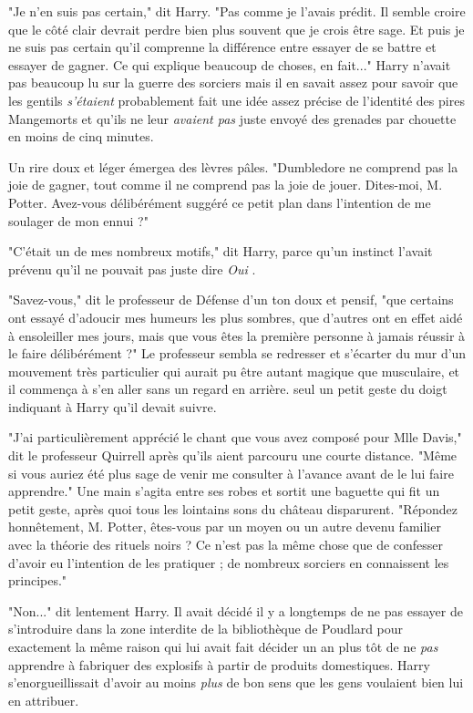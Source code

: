 "Je n'en suis pas certain," dit Harry. "Pas comme je l'avais prédit. Il semble croire que le côté clair devrait perdre bien plus souvent que je crois être sage. Et puis je ne suis pas certain qu'il comprenne la différence entre essayer de se battre et essayer de gagner. Ce qui explique beaucoup de choses, en fait..." Harry n'avait pas beaucoup lu sur la guerre des sorciers mais il en savait assez pour savoir que les gentils \emph{s'étaient } probablement fait une idée assez précise de l'identité des pires Mangemorts et qu'ils ne leur \emph{avaient pas}  juste envoyé des grenades par chouette en moins de cinq minutes.

Un rire doux et léger émergea des lèvres pâles. "Dumbledore ne comprend pas la joie de gagner, tout comme il ne comprend pas la joie de jouer. Dites-moi, M. Potter. Avez-vous délibérément suggéré ce petit plan dans l'intention de me soulager de mon ennui ?"

"C'était un de mes nombreux motifs," dit Harry, parce qu'un instinct l'avait prévenu qu'il ne pouvait pas juste dire \emph{Oui} .

"Savez-vous," dit le professeur de Défense d'un ton doux et pensif, "que certains ont essayé d'adoucir mes humeurs les plus sombres, que d'autres ont en effet aidé à ensoleiller mes jours, mais que vous êtes la première personne à jamais réussir à le faire délibérément ?" Le professeur sembla se redresser et s'écarter du mur d'un mouvement très particulier qui aurait pu être autant magique que musculaire, et il commença à s'en aller sans un regard en arrière. seul un petit geste du doigt indiquant à Harry qu'il devait suivre.

"J'ai particulièrement apprécié le chant que vous avez composé pour Mlle Davis," dit le professeur Quirrell après qu'ils aient parcouru une courte distance. "Même si vous auriez été plus sage de venir me consulter à l'avance avant de le lui faire apprendre." Une main s'agita entre ses robes et sortit une baguette qui fit un petit geste, après quoi tous les lointains sons du château disparurent. "Répondez honnêtement, M. Potter, êtes-vous par un moyen ou un autre devenu familier avec la théorie des rituels noirs ? Ce n'est pas la même chose que de confesser d'avoir eu l'intention de les pratiquer ; de nombreux sorciers en connaissent les principes."

"Non..." dit lentement Harry. Il avait décidé il y a longtemps de ne pas essayer de s'introduire dans la zone interdite de la bibliothèque de Poudlard pour exactement la même raison qui lui avait fait décider un an plus tôt de ne \emph{pas}  apprendre à fabriquer des explosifs à partir de produits domestiques. Harry s'enorgueillissait d'avoir au moins \emph{plus}  de bon sens que les gens voulaient bien lui en attribuer.

